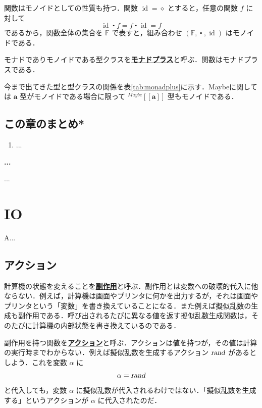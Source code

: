 \documentclass[a4paper,twocolumn]{jsbook}
\def\[{\left[\!\left[}
\def\]{\right]\!\right]}
\newenvironment{note}[1]{\begin{boxnote}\begin{center}\textbf{#1}\end{center}}{\end{boxnote}}
\newcommand{\keyword}[1]{{\underline{\textbf{#1}}}}
\newcommand{\mAnonParam}{\diamond}
\DeclareMathOperator{\mId}{id}
\newcommand{\mAction}[1]{\textsl{#1}}
\DeclareMathOperator{\mRand}{\mAction{rand}}
\DeclareMathOperator{\mComp}{\centerdot}
\newcommand{\mSpecialSet}[1]{\mathbb{#1}} %
\newcommand{\mFSet}{\mSpecialSet{F}}
\newcommand{\mType}[1]{\mathbf{#1}}
\newcommand{\mTypeConstructor}[1]{\textit{#1}}
\newcommand{\mGenericTypeAssemble}[2]{{}^{\mTypeConstructor{#1}}\[\mType{#2}\]}
\newcommand{\mMaybeType}[1]{\mGenericTypeAssemble{Maybe}{#1}}
\newcommand{\mTupleWith}[1]{\left(#1\right)}
\begin{document}
関数はモノイドとしての性質も持つ．関数 $\mId=\mAnonParam$ とすると，任意の関数 $f$ に対して
\begin{equation}
\mId\mComp f=f\mComp\mId=f
\end{equation}
であるから，関数全体の集合を $\mFSet$ で表すと，組み合わせ $\mTupleWith{\mFSet,\mComp,\mId}$ はモノイドである．

モナドでありモノイドである型クラスを\keyword{モナドプラス}と呼ぶ．関数はモナドプラスである．

今まで出てきた型と型クラスの関係を表\ref{tab:monadplus}に示す．Maybeに関しては $\mType{a}$ 型がモノイドである場合に限って $\mMaybeType{a}$ 型もモノイドである．

\section{この章のまとめ*}

\begin{enumerate}
\item ...
\end{enumerate}


\begin{note}{...}
...
\end{note}


\chapter{IO}
\label{ch:io}

A...

\section{アクション}

計算機の状態を変えることを\keyword{副作用}と呼ぶ．副作用とは変数への破壊的代入に他ならない．例えば，計算機は画面やプリンタに何かを出力するが，それは画面やプリンタという「変数」を書き換えていることになる．また例えば擬似乱数の生成も副作用である．呼び出されるたびに異なる値を返す擬似乱数生成関数は，そのたびに計算機の内部状態を書き換えているのである．

副作用を持つ関数を\keyword{アクション}と呼ぶ．アクションは値を持つが，その値は計算の実行時までわからない．例えば擬似乱数を生成するアクション $\mRand$ があるとしよう．これを変数 $\alpha$ に
\begin{equation}
\alpha=\mRand
\end{equation}
と代入しても，変数 $\alpha$ に擬似乱数が代入されるわけではない．「擬似乱数を生成する」というアクションが $\alpha$ に代入されたのだ．
\end{document}
